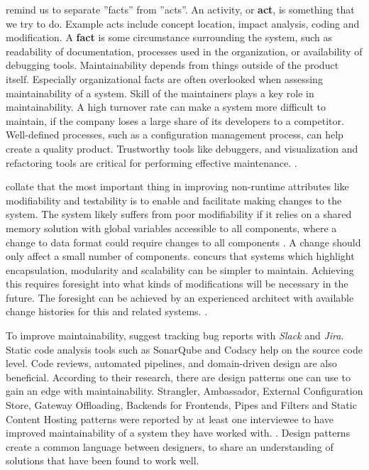 \documentclass[utf8,english]{gradu3}
\begin{document}
\textcite{Broy2006} remind us to separate ''facts'' from ''acts''. An activity,
or \textbf{act}, is something that we try to do. Example acts include concept location,
impact analysis, coding and modification. A \textbf{fact} is some circumstance
surrounding the system, such as readability of documentation, processes used in
the organization, or availability of debugging tools. Maintainability depends
from things outside of the product itself. Especially organizational facts are
often overlooked when assessing maintainability of a system. Skill of the
maintainers plays a key role in maintainability. A high turnover rate can make a
system more difficult to maintain, if the company loses a large share of its
developers to a competitor. Well-defined processes, such as a configuration
management process, can help create a quality product. Trustworthy tools like
debuggers, and visualization and refactoring tools are critical for performing
effective maintenance. \parencite[25-26]{Broy2006}.

\textcite{Bass1998} collate that the most important thing in improving
non-runtime attributes like modifiability and testability is to enable and
facilitate making changes to the system. The system likely suffers from poor
modifiability if it relies on a shared memory solution with global variables
accessible to all components, where a change to data format could require
changes to all components \parencite[89]{Bass1998}. A change should only affect a small number of
components. \textcite[96]{IEEE12207} concurs that systems which highlight
encapsulation, modularity and scalability can be simpler to maintain. Achieving
this requires foresight into what kinds of modifications will be necessary in
the future. The foresight can be achieved by an experienced architect with
available change histories for this and related systems. \parencite[118]{Bass1998}.

To improve maintainability, \textcite[7]{Vale2022} suggest tracking bug reports
with \textit{Slack} and \textit{Jira}. Static code analysis tools such as SonarQube and Codacy
help on the source code level. Code reviews, automated pipelines, and
domain-driven design are also beneficial. According to their research, there are
design patterns one can use to gain an edge with maintainability. Strangler,
Ambassador, External Configuration Store, Gateway Offloading, Backends for
Frontends, Pipes and Filters and Static Content Hosting patterns were reported
by at least one interviewee to have improved maintainability of a system they
have worked with. \parencite[4-6]{Vale2022}. Design patterns create a common
language between designers, to share an understanding of solutions that have
been found to work well.
\end{document}
